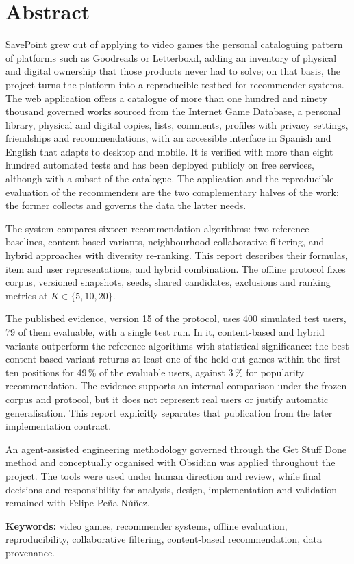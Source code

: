 \chapter*{Abstract}

SavePoint grew out of applying to video games the personal cataloguing pattern of platforms such as Goodreads or Letterboxd, adding an inventory of physical and digital ownership that those products never had to solve; on that basis, the project turns the platform into a reproducible testbed for recommender systems. The web application offers a catalogue of more than one hundred and ninety thousand governed works sourced from the Internet Game Database, a personal library, physical and digital copies, lists, comments, profiles with privacy settings, friendships and recommendations, with an accessible interface in Spanish and English that adapts to desktop and mobile. It is verified with more than eight hundred automated tests and has been deployed publicly on free services, although with a subset of the catalogue. The application and the reproducible evaluation of the recommenders are the two complementary halves of the work: the former collects and governs the data the latter needs.

The system compares sixteen recommendation algorithms: two reference baselines, content-based variants, neighbourhood collaborative filtering, and hybrid approaches with diversity re-ranking. This report describes their formulas, item and user representations, and hybrid combination. The offline protocol fixes corpus, versioned snapshots, seeds, shared candidates, exclusions and ranking metrics at $K\in\{5,10,20\}$.

The published evidence, version 15 of the protocol, uses 400 simulated test users, 79 of them evaluable, with a single test run. In it, content-based and hybrid variants outperform the reference algorithms with statistical significance: the best content-based variant returns at least one of the held-out games within the first ten positions for 49\,\% of the evaluable users, against 3\,\% for popularity recommendation. The evidence supports an internal comparison under the frozen corpus and protocol, but it does not represent real users or justify automatic generalisation. This report explicitly separates that publication from the later implementation contract.

An agent-assisted engineering methodology governed through the Get Stuff Done method and conceptually organised with Obsidian was applied throughout the project. The tools were used under human direction and review, while final decisions and responsibility for analysis, design, implementation and validation remained with Felipe Peña Núñez.

\vspace{.5cm}
\textbf{Keywords:} video games, recommender systems, offline evaluation, reproducibility, collaborative filtering, content-based recommendation, data provenance.
